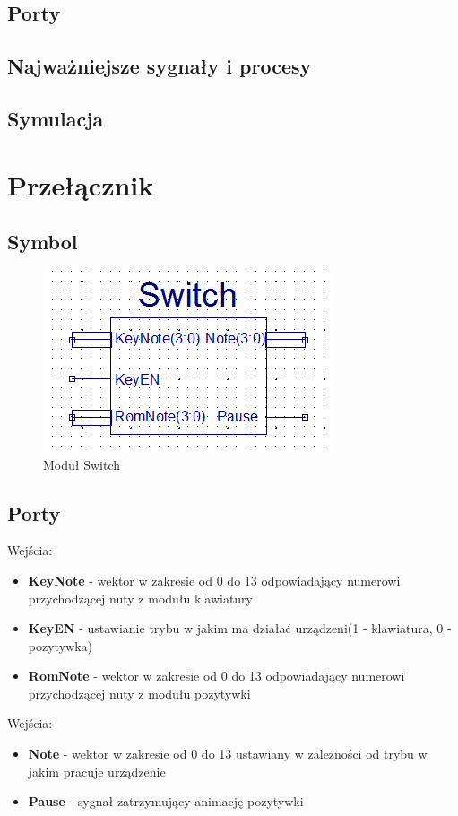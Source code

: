 \documentclass[a4paper]{report}
\begin{document}
		\subsection{Porty}
		\subsection{Najważniejsze sygnały i procesy}
		\subsection{Symulacja}
	\newpage
	\section{Przełącznik}
		\subsection{Symbol}	
			\begin{figure}[h!]
				\centering
				\includegraphics{switch2.png}
				\caption{Moduł Switch}
			\end{figure}
		\subsection{Porty}
			{\Large Wejścia:}
			\begin{itemize}	 
				\item \textbf{KeyNote} - wektor w zakresie od 0 do 13 odpowiadający numerowi przychodzącej nuty z modułu klawiatury
				\item \textbf{KeyEN} - ustawianie trybu w jakim ma działać urządzeni(1 - klawiatura, 0 - pozytywka)
				\item \textbf{RomNote} - wektor w zakresie od 0 do 13 odpowiadający numerowi przychodzącej nuty z modułu pozytywki
			\end{itemize}
		{\Large Wejścia:}
			\begin{itemize} 
				\item \textbf{Note} - wektor w zakresie od 0 do 13 ustawiany w zależności od trybu w jakim pracuje urządzenie
				\item \textbf{Pause} - sygnał zatrzymujący animację pozytywki
			\end{itemize}
\end{document}
